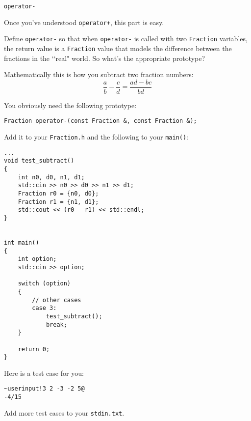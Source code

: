\texttt{operator-}

Once you've understood \verb!operator+!, this part is easy.

Define \verb!operator-! so that when \verb!operator-! is called with two
\verb!Fraction! variables, the return value is a \verb!Fraction! value that
models the difference between the fractions in the \lq\lq real" world. So
what's the appropriate prototype?

Mathematically this is how you subtract two fraction numbers:
\[
\frac{a}{b} -
\frac{c}{d} =
\frac{ad - bc}{bd}
\]

You obviously need the following prototype:

\begin{Verbatim}[frame=single]
Fraction operator-(const Fraction &, const Fraction &);
\end{Verbatim}

Add it to your \verb!Fraction.h! and the following to your \verb!main()!:

{\small
\begin{Verbatim}[frame=single]
...
void test_subtract()
{
    int n0, d0, n1, d1;
    std::cin >> n0 >> d0 >> n1 >> d1;  
    Fraction r0 = {n0, d0};
    Fraction r1 = {n1, d1};
    std::cout << (r0 - r1) << std::endl;
}


int main()
{
    int option;
    std::cin >> option;
    
    switch (option)
    {
        // other cases
        case 3:
            test_subtract();
            break;
    }

    return 0; 
}
\end{Verbatim}
}

Here is a test case for you:

\resett
\nextt
\begin{Verbatim}[frame=single,commandchars=~!@]
~userinput!3 2 -3 -2 5@
-4/15
\end{Verbatim}

Add more test cases to your \verb!stdin.txt!.
